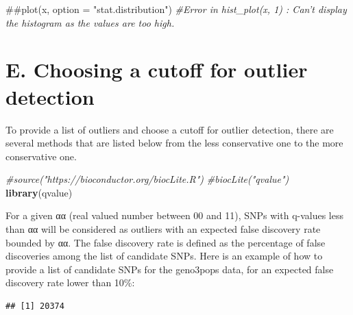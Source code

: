 \documentclass[]{article}
\newenvironment{Shaded}{\begin{snugshade}}{\end{snugshade}}
\newcommand{\KeywordTok}[1]{\textcolor[rgb]{0.13,0.29,0.53}{\textbf{#1}}}
\newcommand{\FloatTok}[1]{\textcolor[rgb]{0.00,0.00,0.81}{#1}}
\newcommand{\StringTok}[1]{\textcolor[rgb]{0.31,0.60,0.02}{#1}}
\newcommand{\CommentTok}[1]{\textcolor[rgb]{0.56,0.35,0.01}{\textit{#1}}}
\newcommand{\OperatorTok}[1]{\textcolor[rgb]{0.81,0.36,0.00}{\textbf{#1}}}
\newcommand{\NormalTok}[1]{#1}
\begin{document}
\begin{Shaded}
\begin{Highlighting}[]
\NormalTok{##plot(x, option = "stat.distribution")}
\CommentTok{#Error in hist_plot(x, 1) : Can't display the histogram as the values are too high.}
\end{Highlighting}
\end{Shaded}

\section{E. Choosing a cutoff for outlier
detection}\label{e.-choosing-a-cutoff-for-outlier-detection}

To provide a list of outliers and choose a cutoff for outlier detection,
there are several methods that are listed below from the less
conservative one to the more conservative one.

\begin{Shaded}
\begin{Highlighting}[]
\CommentTok{#source("https://bioconductor.org/biocLite.R")}
\CommentTok{#biocLite("qvalue")}
\KeywordTok{library}\NormalTok{(qvalue)}
\end{Highlighting}
\end{Shaded}

For a given αα (real valued number between 00 and 11), SNPs with
q-values less than αα will be considered as outliers with an expected
false discovery rate bounded by αα. The false discovery rate is defined
as the percentage of false discoveries among the list of candidate SNPs.
Here is an example of how to provide a list of candidate SNPs for the
geno3pops data, for an expected false discovery rate lower than 10\%:

\begin{Shaded}
\end{Shaded}

\begin{verbatim}
## [1] 20374
\end{verbatim}
\end{document}
